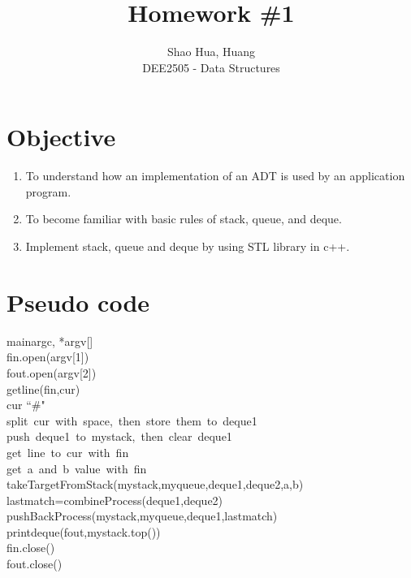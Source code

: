 \documentclass[12pt]{article}
\title{Homework \#1}
\author{Shao Hua, Huang\\
DEE2505 - Data Structures}
\begin{document}
\maketitle
\section{Objective}
\begin{enumerate}
  \item To understand how an implementation of an ADT is used by an application program.
  \item To become familiar with basic rules of stack, queue, and deque.
  \item Implement stack, queue and deque by using STL library in c++.
\end{enumerate}
\section{Pseudo code}
\begin{pseudocode}[ruled]{main}{argc, *argv[]}
  \\
  \MAIN
    fin.open(argv[1])\\
    fout.open(argv[2])\\
    getline(fin,cur)\\
    \WHILE cur \ne ``\#" \DO
    \BEGIN
      \\
      \mbox{split cur with space, then store them to deque1}\\
      \mbox{push deque1 to mystack, then clear deque1}\\
      \mbox{get line to cur with fin}
    \END\\
    \WHILE \mbox{get a and b value with fin} \DO
    \BEGIN
      \\
      takeTargetFromStack(mystack,myqueue,deque1,deque2,a,b)\\
      lastmatch=combineProcess(deque1,deque2)\\
      pushBackProcess(mystack,myqueue,deque1,lastmatch)
    \END\\
    printdeque(fout,mystack.top())\\
    fin.close()\\
    fout.close()
  \ENDMAIN\\
\end{pseudocode}\\
\end{document}
